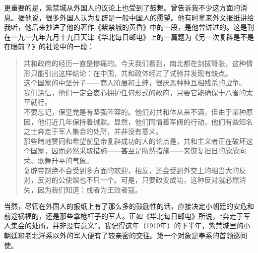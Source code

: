 更重要的是，紫禁城从外国人的议论上也受到了鼓舞。曾告诉我不少这方面的消息。据他说，很多外国人认为复辟是一般中国人的愿望。他有时拿来外文报纸讲给我听，他后来抄进了他的著作《紫禁城的黄昏》中的一段，是他曾讲过的。这是刊在一九一九年九月十九日天津《华北每日邮电》上的一篇题为《另一次复辟是不是在眼前？》的社论中的一段：\\

\begin{quote}
	共和政府的经历一直是惨痛的。今天我们看到，南北都在剑拔弩张，这种情形只能引出这样结论：在中国，共和政体经过了试验并发现有缺点。\\

这个国家的中坚分子——商人阶层和士绅，很厌恶种种互相残杀的战争。\\

我们深信，他们一定会衷心拥护任何形式的政府，只要它能确保十八省的太平就行。\\

不要忘记，保皇党是有坚强阵容的。他们对共和体从来不满，但由于某种原因，他们近几年保持着缄默。显然，他们同情着军阀的行动，他们有些知名之士奔走于军人集会的处所，并非没有意义。\\

那些暗地赞同和希望前皇帝复辟成功的人的论点是，共和主义者正在破坏这个国家，因而必然采取措施——甚至是断然措施——来恢复旧日的欣欣向荣、歌舞升平的气象。\\

复辟帝制绝不会受到多方面的欢迎，相反，还会受到外交上的相当大的反对，反对的公使馆也不只一个。可是，只要政变成功，这种反对就必然消失，因为我们知道：成者为王败者寇。\\
\end{quote}

当然，尽管在外国人的报纸上有了那么多的鼓励性的话，直接决定小朝廷的安危和前途祸福的，还是那些拿枪杆子的军人。正如《华北每日邮电》所说，“奔走于军人集会的处所，并非没有意义”。我记得这年（1919年）的下半年，紫禁城里的小朝廷和老北洋系以外的军人便有了较亲密的交往。第一个对象是奉系的首领巡间使。\\

